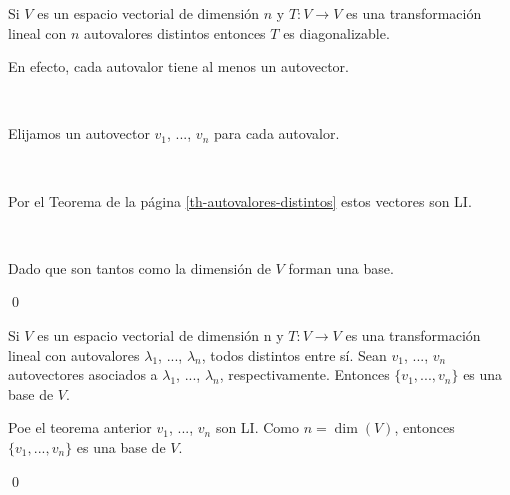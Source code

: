 \documentclass{beamer} %
\begin{document}
\begin{frame}
    
    \begin{corolario}        
        Si $V$ es un espacio vectorial de dimensión $n$ y $T:V\longrightarrow V$ es una transformación lineal con $n$ autovalores distintos entonces $T$ es diagonalizable.
        
    \end{corolario}\pause
    
    \begin{demostracion}\pause
        En efecto, cada autovalor tiene al menos un autovector. 
    
    \
    
    Elijamos un autovector $v_1$, ..., $v_n$ para cada autovalor.
    
    \
    
    Por el Teorema de la página \ref{th-autovalores-distintos} estos vectores son LI. 
    
    \
    
    Dado que son tantos como la dimensión de $V$ forman una base.

    \qed
    \end{demostracion}
    
\end{frame}

\begin{frame}
    
    \begin{corolario}
        Si $V$ es un espacio vectorial de dimensión n y $T:V\longrightarrow V$ es una transformación lineal con autovalores $\lambda_1$, ..., $\lambda_n$, todos distintos entre sí. Sean $v_1$, ..., $v_n$ autovectores asociados a $\lambda_1$, ..., $\lambda_n$, respectivamente. Entonces $\{v_1, ..., v_n\}$ es una base de $V$.
    \end{corolario}\pause
    
    \begin{demostracion}\pause
        Poe  el teorema anterior $v_1$, ..., $v_n$ son LI. Como $n= \dim(V)$, entonces  $\{v_1, ..., v_n\}$ es una base de $V$.
        
        \qed
    \end{demostracion}
    
\end{frame}
\end{document}
